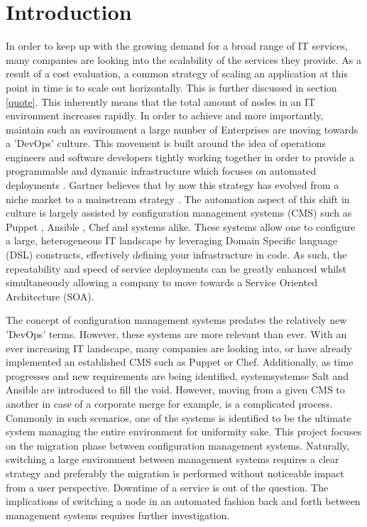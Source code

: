 \section{Introduction}\label{sec:introduction}
In order to keep up with the growing demand for a broad range of IT services, many companies are looking into the scalability of the services they provide. As a result of a cost evaluation, a common strategy of scaling an application at this point in time is to scale out horizontally. This is further discussed in section \ref{quote}. This inherently means that the total amount of nodes in an IT environment increases rapidly. In order to achieve and more importantly, maintain such an environment a large number of Enterprises are moving towards a 'DevOps' culture. This movement is built around the idea of operations engineers and software developers tightly working together in order to provide a programmable and dynamic infrastructure which focuses on automated deployments \cite{loukides_2012}. Gartner believes that by now this strategy has evolved from a niche market to a mainstream strategy \cite{gartner_2015}. The automation aspect of this shift in culture is largely assisted by configuration management systems (CMS) such as Puppet \cite{whatispuppet}, Ansible \cite{whatisansible}, Chef \cite{whatischef} and systems alike. These systems allow one to configure a large, heterogeneous IT landscape by leveraging Domain Specific language (DSL) constructs, effectively defining your infrastructure in code. As such, the repeatability and speed of service deployments can be greatly enhanced whilst simultaneously allowing a company to move towards a Service Oriented Architecture (SOA).

The concept of configuration management systems predates the relatively new 'DevOps' terms. However, these systems are more relevant than ever. With an ever increasing IT landscape, many companies are looking into, or have already implemented an established CMS such as Puppet or Chef. Additionally, as time progresses and new requirements are being identified, systemsystemse Salt and Ansible are introduced to fill the void. However, moving from a given CMS to another in case of a corporate merge for example, is a complicated process. Commonly in such scenarios, one of the systems is identified to be the ultimate system managing the entire environment for uniformity sake. This project focuses on the migration phase between configuration management systems. Naturally, switching a large environment between management systems requires a clear strategy and preferably the migration is performed without noticeable impact from a user perspective. Downtime of a service is out of the question. The implications of switching a node in an automated fashion back and forth between management systems requires further investigation. 

